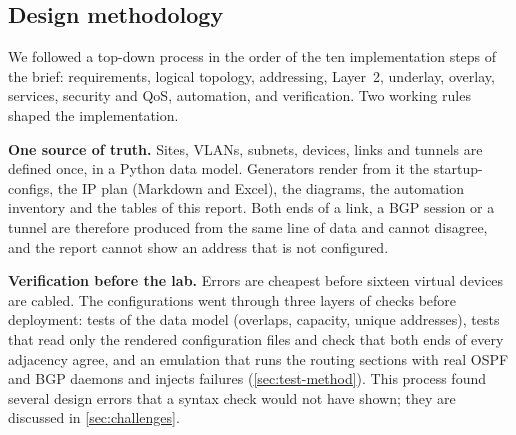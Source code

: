 \subsection{Design methodology}\label{sec:req-method}
We followed a top-down process in the order of the ten implementation steps of the brief: requirements,
logical topology, addressing, Layer~2, underlay, overlay, services, security and QoS, automation, and
verification. Two working rules shaped the implementation.

\textbf{One source of truth.} Sites, VLANs, subnets, devices, links and tunnels are defined once, in a Python
data model. Generators render from it the startup-configs, the IP plan (Markdown and Excel), the diagrams,
the automation inventory and the tables of this report. Both ends of a link, a BGP session or a tunnel are
therefore produced from the same line of data and cannot disagree, and the report cannot show an address
that is not configured.

\textbf{Verification before the lab.} Errors are cheapest before sixteen virtual devices are cabled. The
configurations went through three layers of checks before deployment: tests of the data model (overlaps,
capacity, unique addresses), tests that read only the rendered configuration files and check that both
ends of every adjacency agree, and an emulation that runs the routing sections with real OSPF and BGP
daemons and injects failures (\cref{sec:test-method}). This process found several design errors that a
syntax check would not have shown; they are discussed in \cref{sec:challenges}.
